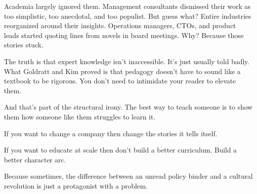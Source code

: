 \medskip

Academia largely ignored them. Management consultants dismissed their work as too simplistic, too anecdotal, and too populist.
But guess what?
Entire industries reorganized around their insights.
Operations managers, CTOs, and product leads started quoting lines from novels in board meetings.
Why? Because those stories stuck.

The truth is that expert knowledge isn’t inaccessible.
It’s just usually told badly.
What Goldratt and Kim proved is that pedagogy doesn’t have to sound like a textbook to be rigorous.
You don’t need to intimidate your reader to elevate them.

And that’s part of the structural irony.
The best way to teach someone is to show them how someone like them struggles to learn it.

If you want to change a company then change the stories it tells itself.

If you want to educate at scale then don’t build a better curriculum. Build a better character arc.

Because sometimes, the difference between an unread policy binder and a cultural revolution is just a protagonist with a problem.